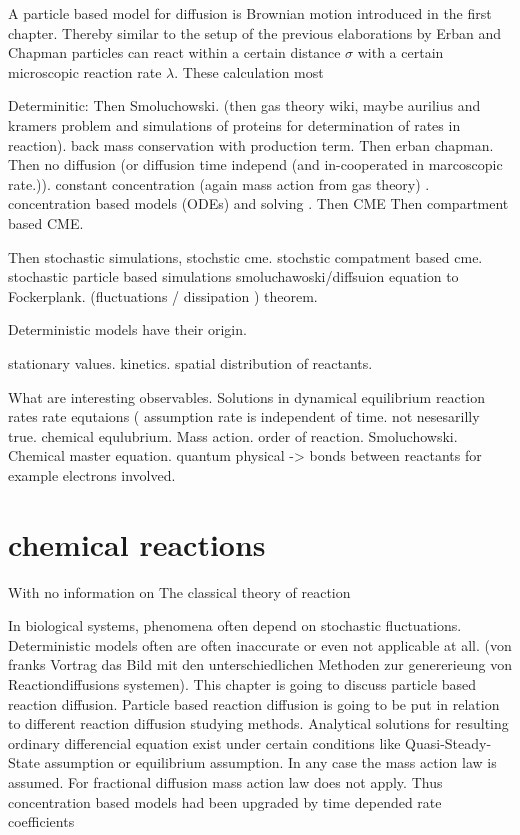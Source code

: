 \documentclass[
  a4paper,BCOR10mm,oneside,
  bibtotoc,idxtotoc,
  headsepline,footsepline,%
  fleqn,openbib
]{scrbook}
\begin{document}
A particle based model for diffusion is Brownian motion introduced in the first chapter. Thereby similar to the setup of the previous elaborations by Erban and Chapman  particles can react within a certain distance $\sigma$ with a certain microscopic reaction rate $\lambda$. These calculation most 

Determinitic:
Then Smoluchowski. (then gas theory wiki, maybe aurilius and kramers problem and simulations of proteins for determination of rates in reaction). back mass conservation with  production term. Then erban chapman. Then no diffusion (or diffusion time independ (and in-cooperated in marcoscopic rate.)). constant concentration (again mass action from gas theory)  . concentration  based models (ODEs) and solving . Then CME Then compartment based CME. 

Then stochastic simulations, stochstic cme. stochstic compatment based cme. stochastic particle based simulations smoluchawoski/diffsuion equation to Fockerplank. (fluctuations / dissipation ) theorem.

 






Deterministic models have their origin.  


stationary values. kinetics. spatial distribution of reactants. 

What are interesting observables. Solutions in dynamical equilibrium reaction rates rate equtaions ( assumption rate is independent of time. not nesesarilly true.  chemical equlubrium. Mass action. order of reaction. Smoluchowski. Chemical master equation. quantum physical -> bonds between reactants for example electrons involved.
\section{chemical reactions}
With no information on 
The classical theory of reaction 
 







In biological systems, phenomena often depend on stochastic fluctuations. Deterministic models often are often inaccurate or even not applicable at all. 
(von franks Vortrag das Bild mit den unterschiedlichen Methoden zur genererieung von Reactiondiffusions systemen). 
This chapter is going to discuss particle based reaction diffusion. Particle based reaction diffusion is going to be put in relation to different reaction diffusion studying methods.  
Analytical solutions for resulting ordinary differencial equation exist under certain conditions like Quasi-Steady-State assumption or equilibrium assumption. In any case the mass action law is assumed. For fractional diffusion mass action law does not apply. Thus concentration based models had been upgraded by time depended rate coefficients \cite{Berry2002}  \cite{schnell2004reaction}
\end{document}
